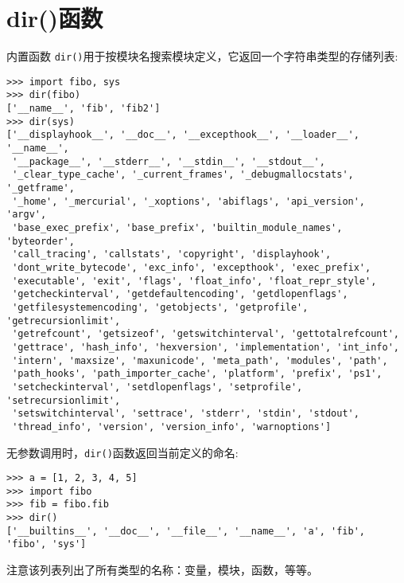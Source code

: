 \section{dir()函数}
内置函数 \texttt{dir()}用于按模块名搜索模块定义，它返回一个字符串类型的存储列表:
\begin{lstlisting}
>>> import fibo, sys
>>> dir(fibo)
['__name__', 'fib', 'fib2']
>>> dir(sys)
['__displayhook__', '__doc__', '__excepthook__', '__loader__', '__name__',
 '__package__', '__stderr__', '__stdin__', '__stdout__',
 '_clear_type_cache', '_current_frames', '_debugmallocstats', '_getframe',
 '_home', '_mercurial', '_xoptions', 'abiflags', 'api_version', 'argv',
 'base_exec_prefix', 'base_prefix', 'builtin_module_names', 'byteorder',
 'call_tracing', 'callstats', 'copyright', 'displayhook',
 'dont_write_bytecode', 'exc_info', 'excepthook', 'exec_prefix',
 'executable', 'exit', 'flags', 'float_info', 'float_repr_style',
 'getcheckinterval', 'getdefaultencoding', 'getdlopenflags',
 'getfilesystemencoding', 'getobjects', 'getprofile', 'getrecursionlimit',
 'getrefcount', 'getsizeof', 'getswitchinterval', 'gettotalrefcount',
 'gettrace', 'hash_info', 'hexversion', 'implementation', 'int_info',
 'intern', 'maxsize', 'maxunicode', 'meta_path', 'modules', 'path',
 'path_hooks', 'path_importer_cache', 'platform', 'prefix', 'ps1',
 'setcheckinterval', 'setdlopenflags', 'setprofile', 'setrecursionlimit',
 'setswitchinterval', 'settrace', 'stderr', 'stdin', 'stdout',
 'thread_info', 'version', 'version_info', 'warnoptions']
\end{lstlisting}
无参数调用时，\texttt{dir()}函数返回当前定义的命名:
\begin{lstlisting}
>>> a = [1, 2, 3, 4, 5]
>>> import fibo
>>> fib = fibo.fib
>>> dir()
['__builtins__', '__doc__', '__file__', '__name__', 'a', 'fib', 'fibo', 'sys']
\end{lstlisting}
注意该列表列出了所有类型的名称：变量，模块，函数，等等。

